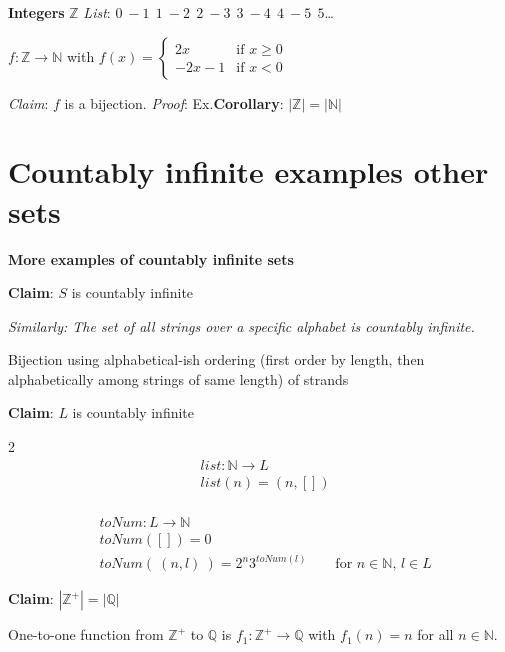 \documentclass[12pt, oneside]{article}
\begin{document}
{\bf Integers} $\mathbb{Z}$ \hfill {\it List}:  $0~-1~~1~-2~~2~-3~~3~-4~~4~-5~~5$\ldots

$f: \mathbb{Z} \to \mathbb{N}$ with $f(x) = \begin{cases}2x &\text{if $x \geq 0$} \\-2x-1 &\text{if $x < 0$} \end{cases}$

{\it Claim}: $f$ is a bijection.  {\it Proof}: Ex.\hfill {\bf Corollary}: $ | \mathbb{Z} | = |\mathbb{N}|$
\newpage


 \vfill
\section*{Countably infinite examples other sets}


{\bf More examples of countably infinite sets}

{\bf Claim}: $S$ is countably infinite

{\it Similarly: The set of all strings over a specific alphabet is countably infinite.}
\begin{center}
Bijection using alphabetical-ish ordering
(first order by length, then alphabetically among strings of same length) 
of strands
\end{center}

\vspace{50pt}


{\bf Claim}: $L$ is countably infinite

\begin{multicols}{2}
\begin{align*}
    &list: \mathbb{N} \to L \\
    &list(n) = (n, []) \\
    &
\end{align*}

\begin{align*}
    &toNum: L \to \mathbb{N} \\
    &toNum([]) = 0 \\
    &toNum( ~(n,l)~) = 2^n 3^{toNum(l)} \qquad \text{for $n \in \mathbb{N}$, $l \in L$}
\end{align*}
\end{multicols}
\vspace{30pt}

{\bf Claim}: $|\mathbb{Z}^+| = |\mathbb{Q}|$ 

One-to-one function from $\mathbb{Z}^+$ to $\mathbb{Q}$
is $f_1: \mathbb{Z}^+ \to \mathbb{Q}$ with $f_1(n) = n$ for all 
$n \in \mathbb{N}$.
\end{document}
